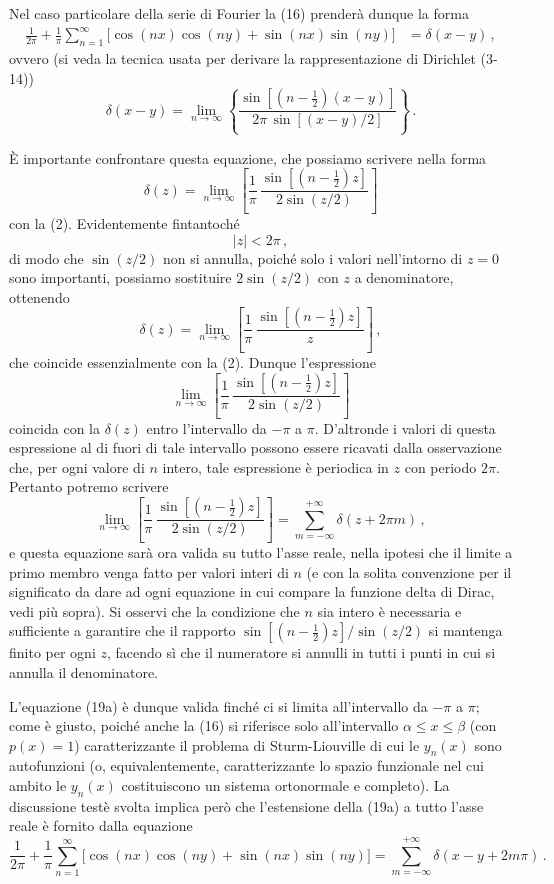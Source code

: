 \documentclass[11pt, a4paper]{book}
\numberwithin{equation}{section}
\begin{document}
Nel caso particolare della serie di Fourier la (16) prenderà dunque la forma
\begin{align}
  \frac{1}{2\pi} + \frac{1}{\pi}\sum_{n=1}^{\infty}\bigl[\cos(nx)\cos(ny)+\sin(nx)\sin(ny)\bigr]
  &= \delta(x-y)\,, \tag{19a}
\end{align}
ovvero (si veda la tecnica usata per derivare la rappresentazione di Dirichlet (3-14))
\begin{equation}
  \delta(x-y) = \lim_{n\to\infty}\left\{
  \frac{\sin\!\left[(n-\frac{1}{2})(x-y)\right]}{2\pi\,\sin[(x-y)/2]}
  \right\}\,. \tag{19b}
\end{equation}

È importante confrontare questa equazione, che possiamo scrivere nella forma
\[
  \delta(z) = \lim_{n\to\infty}\left[\frac{1}{\pi}\,
  \frac{\sin\!\left[(n-\frac{1}{2})z\right]}{2\sin(z/2)}\right]
\]
con la (2). Evidentemente fintantoché
\[
  |z| < 2\pi\,,
\]
di modo che $\sin(z/2)$ non si annulla, poiché solo i valori nell'intorno di $z=0$ sono importanti, possiamo sostituire $2\sin(z/2)$ con $z$ a denominatore, ottenendo
\[
  \delta(z) = \lim_{n\to\infty}\left[\frac{1}{\pi}\,
  \frac{\sin\!\left[(n-\frac{1}{2})z\right]}{z}\right]\,,
\]
che coincide essenzialmente con la (2). Dunque l'espressione
\[
  \lim_{n\to\infty}\left[\frac{1}{\pi}\,
  \frac{\sin\!\left[(n-\frac{1}{2})z\right]}{2\sin(z/2)}\right]
\]
coincida con la $\delta(z)$ entro l'intervallo da $-\pi$ a $\pi$. D'altronde i valori di questa espressione al di fuori di tale intervallo possono essere ricavati dalla osservazione che, per ogni valore di $n$ intero, tale espressione è periodica in $z$ con periodo $2\pi$. Pertanto potremo scrivere
\[
  \lim_{n\to\infty}\left[\frac{1}{\pi}\,
  \frac{\sin\!\left[(n-\frac{1}{2})z\right]}{2\sin(z/2)}\right]
  = \sum_{m=-\infty}^{+\infty}\delta(z+2\pi m)\,,
\]
e questa equazione sarà ora valida su tutto l'asse reale, nella ipotesi che il limite a primo membro venga fatto per valori interi di $n$ (e con la solita convenzione per il significato da dare ad ogni equazione in cui compare la funzione delta di Dirac, vedi più sopra). Si osservi che la condizione che $n$ sia intero è necessaria e sufficiente a garantire che il rapporto $\sin\!\left[(n-\frac{1}{2})z\right]/\sin(z/2)$ si mantenga finito per ogni $z$, facendo sì che il numeratore si annulli in tutti i punti in cui si annulla il denominatore.

L'equazione (19a) è dunque valida finché ci si limita all'intervallo da $-\pi$ a $\pi$; come è giusto, poiché anche la (16) si riferisce solo all'intervallo $\alpha \leq x \leq \beta$ (con $p(x)=1$) caratterizzante il problema di Sturm-Liouville di cui le $y_n(x)$ sono autofunzioni (o, equivalentemente, caratterizzante lo spazio funzionale nel cui ambito le $y_n(x)$ costituiscono un sistema ortonormale e completo). La discussione testè svolta implica però che l'estensione della (19a) a tutto l'asse reale è fornito dalla equazione
\begin{equation}
  \frac{1}{2\pi}+\frac{1}{\pi}\sum_{n=1}^{\infty}\bigl[\cos(nx)\cos(ny)+\sin(nx)\sin(ny)\bigr]
  = \sum_{m=-\infty}^{+\infty}\delta(x-y+2m\pi)\,. \tag{20}
\end{equation}
\end{document}

